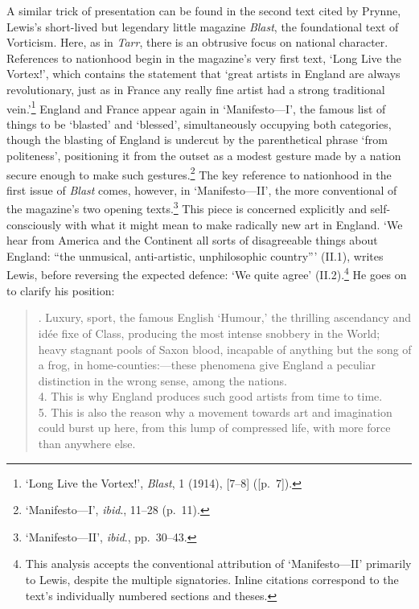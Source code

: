 \documentclass[]{article}
\begin{document}
A similar trick of presentation can be found in the second text cited by
Prynne, Lewis’s short-lived but legendary little magazine \emph{Blast},
the foundational text of Vorticism. Here, as in \emph{Tarr}, there is an
obtrusive focus on national character. References to nationhood begin in
the magazine’s very first text, ‘Long Live the Vortex!’, which contains
the statement that ‘great artists in England are always revolutionary,
just as in France any really fine artist had a strong traditional
vein.’\footnote{‘Long Live the Vortex!’, \emph{Blast}, 1 (1914),
  {[}7–8{]} ({[}p.~7{]}).} England and France appear again in
‘Manifesto—I’, the famous list of things to be ‘blasted’ and ‘blessed’,
simultaneously occupying both categories, though the blasting of England
is undercut by the parenthetical phrase ‘from politeness’, positioning
it from the outset as a modest gesture made by a nation secure enough to
make such gestures.\footnote{‘Manifesto—I’, \emph{ibid}., 11–28 (p.~11).}
The key reference to nationhood in the first issue of \emph{Blast}
comes, however, in ‘Manifesto—II’, the more conventional of the
magazine’s two opening texts.\footnote{‘Manifesto—II’, \emph{ibid}.,
  pp.~30–43.} This piece is concerned explicitly and self-consciously
with what it might mean to make radically new art in England. ‘We hear
from America and the Continent all sorts of disagreeable things about
England: “the unmusical, anti-artistic, unphilosophic country”’ (II.1),
writes Lewis, before reversing the expected defence: ‘We quite agree’
(II.2).\footnote{This analysis accepts the conventional attribution of
  ‘Manifesto—II’ primarily to Lewis, despite the multiple signatories.
  Inline citations correspond to the text’s individually numbered
  sections and theses.} He goes on to clarify his position:

\begin{quote}
. Luxury, sport, the famous English ‘Humour,’ the
thrilling ascendancy and idée fixe of Class, producing the most intense
snobbery in the World; heavy stagnant pools of Saxon blood, incapable of
anything but the song of a frog, in home-counties:—these phenomena give
England a peculiar distinction in the wrong sense, among the nations.\\
4. This is why England produces such good artists from time to time.\\
5. This is also the reason why a movement towards art and imagination
could burst up here, from this lump of compressed life, with more force
than anywhere else.
\end{quote}
\end{document}
